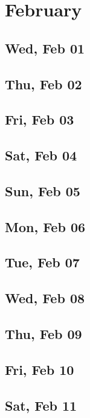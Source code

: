 \chapter{February}
	\section{Wed, Feb 01}
		
	\section{Thu, Feb 02}
		
	\section{Fri, Feb 03}
		
	\section{Sat, Feb 04}
		
	\section{Sun, Feb 05}
		
	\section{Mon, Feb 06}
		
	\section{Tue, Feb 07}
		
	\section{Wed, Feb 08}
		
	\section{Thu, Feb 09}
		
	\section{Fri, Feb 10}
		
	\section{Sat, Feb 11}
		
